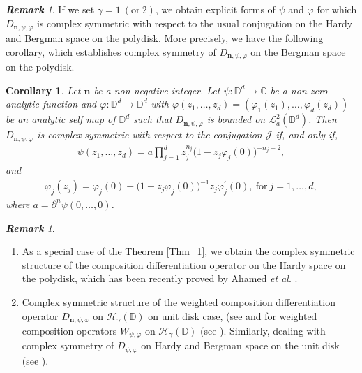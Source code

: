\documentclass[12pt, reqno]{amsart}
\newtheorem{corollary}[theorem]{Corollary}
\theoremstyle{definition}
\theoremstyle{remark}
\newtheorem{remark}[theorem]{\bf{Remark}}
\numberwithin{equation}{section}
\newcommand{\mfn}{\mathbf n}
\begin{document}
\begin{remark}
If we set $\gamma=1~(\mbox{or}~ 2)$, we obtain explicit forms of $\psi$ and $\varphi$ for which $D_{\mfn,\psi,\varphi}$ is complex symmetric with respect to the usual conjugation on the Hardy and Bergman space on the polydisk. More precisely, we have the following corollary, which establishes complex symmetry of $D_{\mfn,\psi,\varphi}$ on the Bergman space on the polydisk.
  \end{remark}
\begin{corollary}
Let  $\mfn$ be a non-negative integer. Let $\psi: \mathbb{D}^d\longrightarrow \mathbb{C}$ be a non-zero analytic function and $\varphi: \mathbb{D}^d\longrightarrow \mathbb{D}^d$ with $\varphi(z_1,  \dots, z_d)=(\varphi_1(z_1), \dots, \varphi_d(z_d))$ be an analytic self map of $\mathbb{D}^d$ such that $D_{\mfn,\psi,\varphi}$ is bounded on $\mathcal{L}_a^2(\mathbb{D}^d)$.
Then $D_{\mfn,\psi,\varphi}$ is complex symmetric with respect to the conjugation $\mathcal{J}$ if, and only if,
\begin{gather*}
\psi(z_1, \dots, z_d)=a\prod_{j=1}^dz_j^{n_j}\big(1-z_j\varphi_j(0)\big)^{-n_j-2},
\end{gather*}
and 
\begin{gather*}
\varphi_j(z_j)=\varphi_j(0)+\big(1-z_j\varphi_j(0)\big)^{-1}z_j\varphi_j^{\prime}(0),~ \mbox{for}~ j=1, \dots, d,
\end{gather*}
where $a=\partial^n\psi(0, \dots, 0)$.
\end{corollary}
\begin{remark}
	\begin{enumerate}
	\item[(i)] 	As a special case of the Theorem \ref{Thm_1}, we obtain the complex symmetric structure of the composition differentiation operator on the Hardy space on the polydisk, which has been recently proved by Ahamed {\it et al}. \cite[Theorem 2.2]{Ahamed_Allu_Rahman_2023}.
		\item[(ii)] Complex symmetric structure of the weighted composition differentiation operator $D_{\mfn,\psi,\varphi}$ on $\mathcal{H}_\gamma(\mathbb{D})$ on unit disk case, (see \cite{Lo_Loh_JMAA_2023} and for weighted composition operators $W_{\psi,\varphi}$ on $\mathcal{H}_\gamma(\mathbb{D})$ (see \cite [Proposition 2.3]{Lim_Khoi_JMAA_2018}). Similarly, dealing with complex symmetry of $D_{\psi,\varphi}$ on Hardy and Bergman space on the unit disk (see \cite{Han_Wang_JMAA_2021,Han_Wang_CAOT_2021}).
	\end{enumerate}
   
	 \end{remark}
\end{document}
